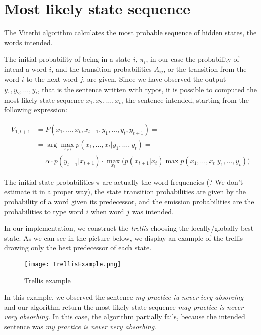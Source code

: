 \section{Most likely state sequence}

The Viterbi algorithm calculates the most probable sequence of hidden states, the words intended.

The initial probability of being in a state $i$, $\pi_i$, in our case the probability of intend a word $i$, and the 
transition probabilities $A_{ij}$, or the transition from the word $i$ to the next word $j$, are given. Since we have 
observed the output $y_1, y_2, \dots , y_t$, that is the sentence written with typos, it is possible to computed the most 
likely state sequence $x_1, x_2, \dots , x_t$, the sentence intended, starting from the following expression:

\begin{equation}
	\begin{align}
		V_{1,t+1} &= P(x_1, \dots, x_t, x_{t+1}, y_1, \dots, y_t,  y_{t+1}) = \\
						&= \arg\max_{x_{1:t}} p(x_1, \dots, x_t | y_1, \dots, y_t) = \\
						& =  \alpha \cdot p(y_{t+1}|x_{t+1})\cdot\max_{x_t} \bigg( p(x_{t+1}|x_t) \max p(x_1, \dots, x_{t}|y_1, 
						\dots, y_t)\bigg)
	\end{align}
\end{equation}

The initial state probabilities $\pi$ are actually the word frequencies (? We don’t estimate it in a proper way), the state 
transition probabilities are given by the probability of a word given its predecessor, and the emission probabilities are the 
probabilities to type word $i$ when word $j$ was intended.

In our implementation, we construct the \textit{trellis} choosing the locally/globally best state. As we can see in the 
picture below, we display an example of the trellis drawing only the best predecessor of each state.

\begin{figure}[H]
	\centering
	\texttt{[image: TrellisExample.png]}
	\caption{Trellis example}
	\label{fig:trellis}
\end{figure}

In this example, we observed the sentence \textsl{my practice iu never iery absorcing} and our algorithm return the most 
likely state sequence \textsl{may practice is never very absorbing}. In this case, the algorithm partially fails, because the 
intended sentence was \textsl{my practice is never very absorbing}.
\\


